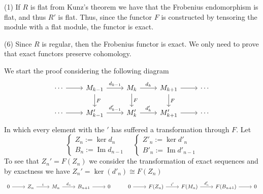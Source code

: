 \documentclass[leqno]{article}
\theoremstyle{definition}
\DeclareMathOperator{\im}{Im}
\begin{document}
(1) If $R$ is flat from Kunz's theorem we have that the Frobenius endomorphism is flat, and thus $R'$ is flat. Thus, since the functor  $F$ is constructed by tensoring the module with a flat module, the functor is exact.

(6) Since $R$ is regular, then the Frobenius functor is exact. We only need to prove that exact functors preserve cohomology.

We start the proof considering the following diagram
\[\begin{tikzcd}
	\cdots & {M_{k-1}} & {M_{k}} & {M_{k+1}} & \cdots \\
	\cdots & {M'_{k-1}} & {M'_{k}} & {M'_{k+1}} & \cdots
	\arrow[from=1-1, to=1-2]
	\arrow[from=2-1, to=2-2]
	\arrow["F", from=1-2, to=2-2]
	\arrow["F", from=1-3, to=2-3]
	\arrow["F", from=1-4, to=2-4]
	\arrow["{d_{k-1}}", from=1-2, to=1-3]
	\arrow["{d_k}", from=1-3, to=1-4]
	\arrow["{d'_k}", from=2-3, to=2-4]
	\arrow["{d'_{k-1}}", from=2-2, to=2-3]
	\arrow[from=1-4, to=1-5]
	\arrow[from=2-4, to=2-5]
\end{tikzcd}\]
In which every element with the $'$ has suffered a transformation through $F$. Let
\[
\begin{cases}
  Z_n := \ker d_n\\
  B_n := \im d_{n-1}
\end{cases} \quad
\begin{cases}
  Z'_n := \ker d'_n\\
  B'_n := \im d'_{n-1}
\end{cases}
\] 
To see that $Z_n' = F(Z_n)$ we consider the transformation of exact sequences
and by exactness we have  $Z_n'=\ker (d'_n)\cong F(Z_n)$
\[\begin{tikzcd}
	0 & {Z_n} & {M_n} & {B_{n+1}} & 0 & 0 & {F(Z_n)} & {F(M_n)} & {F(B_{n+1})} & 0
	\arrow[from=1-6, to=1-7]
	\arrow["{i'}", from=1-7, to=1-8]
	\arrow["{d'_n}", from=1-8, to=1-9]
	\arrow[from=1-1, to=1-2]
	\arrow["i", from=1-2, to=1-3]
	\arrow["{d_n}", from=1-3, to=1-4]
	\arrow[from=1-4, to=1-5]
	\arrow[from=1-9, to=1-10]
\end{tikzcd}\]
\end{document}
